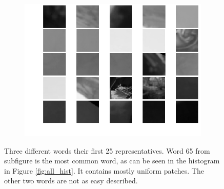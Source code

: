 \documentclass{paper}
\begin{document}
\begin{figure}
\begin{subfigure}[b]{0.32\textwidth}
    \includegraphics[width=\textwidth]{word949}
    \label{fig:949}
  \end{subfigure}
\caption{Three different words their first 25 representatives. Word 65 from subfigure 
is the most common word, as can be seen in the histogram in Figure \ref{fig:all_hist}. It contains 
mostly uniform patches. The other two words are not as easy described.}
\label{fig:words}
\end{figure}
\end{document}
